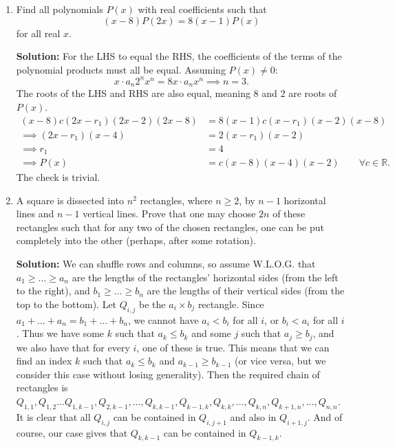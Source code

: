 \documentclass{article}
\begin{document}
\begin{enumerate}[itemsep=24pt plus 12pt minus 9pt]
\item %
Find all polynomials $P(x)$ with real coefficients such that
\[ (x-8)P(2x) = 8(x-1)P(x) \]
for all real $x$.

\textbf{Solution:}
For the LHS to equal the RHS, the coefficients of the terms of the polynomial products must all be equal. Assuming $P(x) \neq 0$:
$$x \cdot a_n 2^nx^n = 8x\cdot a_n x^n \implies n = 3.$$
The roots of the LHS and RHS are also equal, meaning $8$ and $2$ are roots of $P(x)$.
\begin{align*}
  (x-8)c(2x-r_1)(2x-2)(2x-8) &= 8(x-1)c(x-r_1)(x-2)(x-8) \\
  \implies (2x-r_1)(x-4) &= 2(x-r_1)(x-2) \\
  \implies r_1 &= 4 \\
  \implies P(x) &= c(x-8)(x-4)(x-2) \qquad \forall c\in\mathbb{R}.
\end{align*}
The check is trivial.


\item %
A square is dissected into $n^2$ rectangles, where $n\geq 2$, by $n-1$ horizontal lines and $n-1$ vertical lines. Prove that one may choose $2n$ of these rectangles such that for any two of the chosen rectangles, one can be put completely into the other (perhaps, after some rotation).

\textbf{Solution:}
We can shuffle rows and columns, so assume W.L.O.G. that $a_1\geq ... \geq a_n$ are the lengths of the rectangles' horizontal sides (from the left to the right), and $b_1\geq ...\geq b_n$ are the lengths of their vertical sides (from the top to the bottom).
Let $Q_{i,j}$ be the $a_i\times b_j$ rectangle.
Since $a_1+...+a_n=b_1+...+b_n$, we cannot have $a_i<b_i$ for all $i$, or $b_i<a_i$ for all $i$.
Thus we have some $k$ such that $a_k\leq b_k$ and some $j$ such that $a_j\geq b_j$, and we also have that for every $i$, one of these is true.
This means that we can find an index $k$ such that $a_k\leq b_k$ and $a_{k-1}\geq b_{k-1}$ (or vice versa, but we consider this case without losing generality).
Then the required chain of rectangles is $Q_{1,1},Q_{1,2}...Q_{1,k-1},Q_{2,k-1},...,Q_{k,k-1},Q_{k-1,k},Q_{k,k},...,Q_{k,n},Q_{k+1,n},...,Q_{n,n}$.
It is clear that all $Q_{i,j}$ can be contained in $Q_{i,j+1}$ and also in $Q_{i+1,j}$.
And of course, our case gives that $Q_{k,k-1}$ can be contained in $Q_{k-1,k}$.


\end{enumerate}
\end{document}
